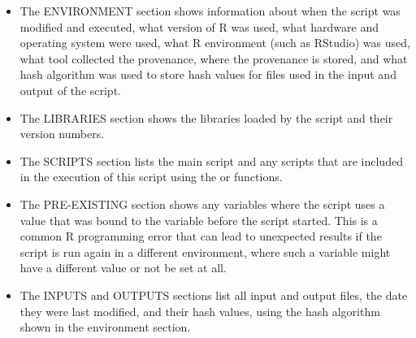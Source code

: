 \begin{itemize}
\item The ENVIRONMENT section shows information about when the script was modified and executed, what version of R was used, what hardware and operating system were used, what R environment (such as RStudio) was used, what tool collected the provenance, where the provenance is stored, and what hash algorithm was used to store hash values for files used in the input and output of the script.


\item The LIBRARIES section shows the libraries loaded by the script and their version numbers.

\item The SCRIPTS section lists the main script and any scripts that are included in the execution of this script using the  or  functions.

\item The PRE-EXISTING section shows any variables where the script uses a value that was bound to the variable before the script started.  This is a common R programming error that can lead to unexpected results if the script is run again in a different environment, where such a variable might have a different value or not be set at all.
\item The INPUTS and OUTPUTS sections list all input and output files, the date they were last modified, and their hash values, using the hash algorithm shown in the environment section.


\end{itemize}
